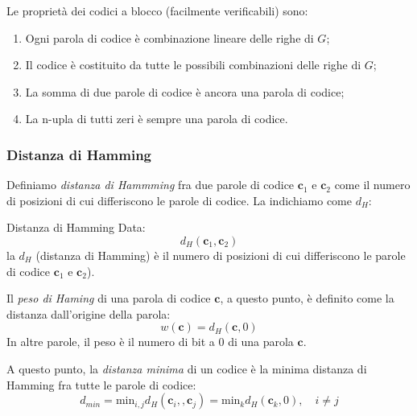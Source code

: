 \documentclass[a4paper,11pt]{article}
\begin{document}
Le proprietà dei codici a blocco (facilmente verificabili) sono:
\begin{enumerate}
	\item 
Ogni parola di codice è combinazione lineare delle righe di $G$;
	\item
Il codice è costituito da tutte le possibili combinazioni delle righe di $G$;
	\item
La somma di due parole di codice è ancora una parola di codice;
	\item
La n-upla di tutti zeri è sempre una parola di codice.
\end{enumerate}

\subsubsection{Distanza di Hamming}
Definiamo \textit{distanza di Hammming} fra due parole di codice $\mathbf{c}_1$ e $\mathbf{c}_2$ come il numero di posizioni di cui differiscono le parole di codice. La indichiamo come $d_H$:
\begin{definition}{Distanza di Hamming}
Data:
$$
d_H(\mathbf{c}_1, \mathbf{c}_2)
$$
la $d_H$ (distanza di Hamming) è il numero di posizioni di cui differiscono le parole di codice $\mathbf{c}_1$ e $\mathbf{c}_2$).
\end{definition}

Il \textit{peso di Haming} di una parola di codice $\mathbf{c}$, a questo punto, è definito come la distanza dall'origine della parola:
$$
w(\mathbf{c}) = d_H(\mathbf{c}, 0)
$$
In altre parole, il peso è il numero di bit a 0 di una parola $\mathbf{c}$.

A questo punto, la \textit{distanza minima} di un codice è la minima distanza di Hamming fra tutte le parole di codice:
$$
d_{min} = \mathrm{min}_{i, j} d_H(\mathbf{c}_i,, \mathbf{c}_j) = \mathrm{min}_k d_H(\mathbf{c}_k, 0), \quad i \neq j
$$
\end{document}
